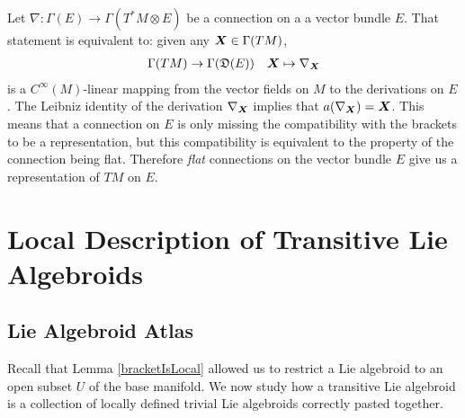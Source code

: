 \begin{example}
Let $\nabla: \Gamma(E) \to \Gamma(T^*M \otimes E)$ be a connection on a a vector bundle $E$. That statement is equivalent to: given any $\bm{X} \in \Gamma(TM)$,
\begin{align*}
    \Gamma(TM) \to \Gamma(\mathfrak{D}(E)) &&
    \bm{X} \mapsto \nabla_{\bm{X}}
\end{align*}
is a $C^\infty(M)$-linear mapping from the vector fields on $M$ to the derivations on $E$. The Leibniz identity of the derivation $\nabla_{\bm{X}}$ implies that $a(\nabla_{\bm{X}}) = \bm{X}$. This means that a connection on $E$ is only missing the compatibility with the brackets to be a representation, but this compatibility is equivalent to the property of the connection being flat. Therefore \emph{flat} connections on the vector bundle $E$ give us a representation of $TM$ on $E$.
\end{example}



\section{Local Description of Transitive Lie Algebroids}\label{chBasicSectionLocalDescription}

\subsection{Lie Algebroid Atlas}
\label{chBasicSubsectionAtlas}

Recall that Lemma \ref{bracketIsLocal} allowed us to restrict a Lie algebroid to an open subset $U$ of the base manifold. We now study how a transitive Lie algebroid is a collection of locally defined trivial Lie algebroids correctly pasted together.

